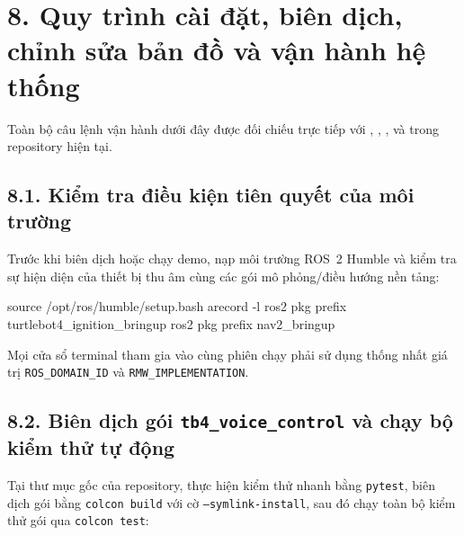 \section*{8. Quy trình cài đặt, biên dịch, chỉnh sửa bản đồ và vận hành hệ thống}

Toàn bộ câu lệnh vận hành dưới đây được đối chiếu trực tiếp với , , ,  và  trong repository hiện tại.

\subsection*{8.1. Kiểm tra điều kiện tiên quyết của môi trường}

Trước khi biên dịch hoặc chạy demo, nạp môi trường ROS~2 Humble và kiểm tra sự hiện diện của thiết bị thu âm cùng các gói mô phỏng/điều hướng nền tảng:

\begin{svcode}
source /opt/ros/humble/setup.bash
arecord -l
ros2 pkg prefix turtlebot4_ignition_bringup
ros2 pkg prefix nav2_bringup
\end{svcode}

Mọi cửa sổ terminal tham gia vào cùng phiên chạy phải sử dụng thống nhất giá trị \texttt{ROS\_DOMAIN\_ID} và \texttt{RMW\_IMPLEMENTATION}.

\subsection*{8.2. Biên dịch gói \texttt{tb4\_voice\_control} và chạy bộ kiểm thử tự động}

Tại thư mục gốc của repository, thực hiện kiểm thử nhanh bằng \texttt{pytest}, biên dịch gói bằng \texttt{colcon build} với cờ \texttt{--symlink-install}, sau đó chạy toàn bộ kiểm thử gói qua \texttt{colcon test}:


